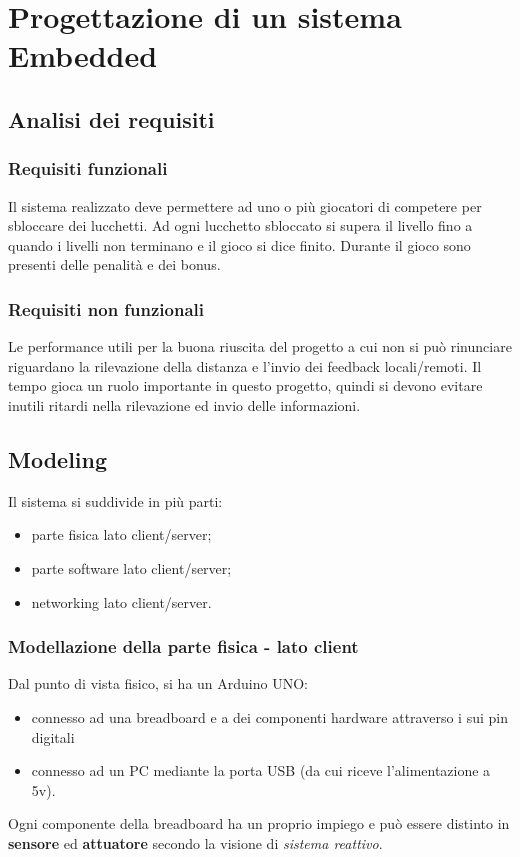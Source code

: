 \chapter{Progettazione di un sistema Embedded}
\section{Analisi dei requisiti}
\subsection{Requisiti funzionali}
Il sistema realizzato deve permettere ad uno o più giocatori di competere per sbloccare dei lucchetti. Ad ogni lucchetto sbloccato si supera il livello fino a quando i livelli non terminano e il gioco si dice finito. Durante il gioco sono presenti delle penalità e dei bonus.

\subsection{Requisiti non funzionali}
Le performance utili per la buona riuscita del progetto a cui non si può rinunciare riguardano la rilevazione della distanza e l'invio dei feedback locali/remoti.
Il tempo gioca un ruolo importante in questo progetto, quindi si devono evitare inutili ritardi nella rilevazione ed invio delle informazioni.

\section{Modeling}
Il sistema si suddivide in più parti:
\begin{itemize}
	\item parte fisica lato client/server;
	\item parte software lato client/server;
	\item networking lato client/server.
\end{itemize}

\subsection{Modellazione della parte fisica - lato client}
Dal punto di vista fisico, si ha un Arduino UNO:
\begin{itemize}
	\item connesso ad una breadboard e a dei componenti hardware attraverso i sui pin digitali
	\item connesso ad un PC mediante la porta USB (da cui riceve l'alimentazione a 5v). 
\end{itemize}
Ogni componente della breadboard ha un proprio impiego e può essere distinto in \textbf{sensore} ed \textbf{attuatore} secondo la visione di \textit{sistema reattivo}.

